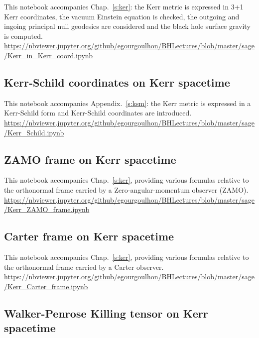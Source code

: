 This notebook accompanies Chap.~\ref{s:ker}: the Kerr metric is expressed in 3+1 Kerr coordinates, the vacuum Einstein equation is checked, the outgoing and ingoing principal null geodesics are considered and the black hole surface gravity is computed.\\[1ex]
{\footnotesize
\url{https://nbviewer.jupyter.org/github/egourgoulhon/BHLectures/blob/master/sage/Kerr_in_Kerr_coord.ipynb}
}

\subsection{Kerr-Schild coordinates on Kerr spacetime} \label{s:sam:Kerr_Schild}

This notebook accompanies Appendix.~\ref{s:ksm}: the Kerr metric is expressed in
a Kerr-Schild form and Kerr-Schild coordinates are introduced.\\[1ex]
{\footnotesize
\url{https://nbviewer.jupyter.org/github/egourgoulhon/BHLectures/blob/master/sage/Kerr_Schild.ipynb}
}

\subsection{ZAMO frame on Kerr spacetime} \label{s:sam:Kerr_ZAMO_frame}

This notebook accompanies Chap.~\ref{s:ker}, providing various formulas relative to
the orthonormal frame carried by a Zero-angular-momentum observer (ZAMO).\\[1ex]
{\footnotesize
\url{https://nbviewer.jupyter.org/github/egourgoulhon/BHLectures/blob/master/sage/Kerr_ZAMO_frame.ipynb}
}

\subsection{Carter frame on Kerr spacetime} \label{s:sam:Kerr_Carter_frame}

This notebook accompanies Chap.~\ref{s:ker}, providing various formulas relative to
the orthonormal frame carried by a Carter observer.\\[1ex]
{\footnotesize
\url{https://nbviewer.jupyter.org/github/egourgoulhon/BHLectures/blob/master/sage/Kerr_Carter_frame.ipynb}
}


\subsection{Walker-Penrose Killing tensor on Kerr spacetime} \label{s:sam:Kerr_Killing_tensor}

